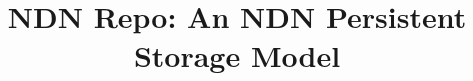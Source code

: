 \documentclass[conference]{IEEEtran}
\begin{document}
%
\title{NDN Repo: An NDN Persistent Storage Model}




%
\end{document}
